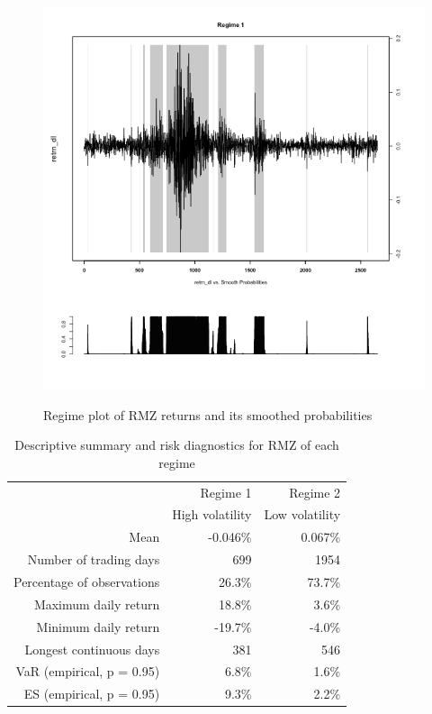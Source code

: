 \documentclass[12pt]{article}
\begin{document}
\begin{figure}[h]
\caption{Regime plot of RMZ returns and its smoothed probabilities} 
\centering 
\includegraphics[width=1\textwidth]{../results/regime/RMZ}
\label{fig: RMZregime}
\end{figure}

\begin{table}[!h]
\caption{Descriptive summary and risk diagnostics for RMZ of each regime} 
\centering 
\begin{tabular}{| r | r | r |} 
 \hline
& Regime 1 & Regime 2 \\
& High volatility & Low volatility \\
 \hline 
Mean & -0.046\% & 0.067\% \\
Number of trading days & 699 & 1954\\ 
Percentage of observations & 26.3\% & 73.7\% \\ 
Maximum daily return &18.8\% & 3.6\% \\
Minimum daily return & -19.7\% & -4.0\% \\
Longest continuous days & 381 & 546\\ \hline
VaR (empirical, p = 0.95) & 6.8\% & 1.6\% \\
ES (empirical, p = 0.95) & 9.3\% & 2.2\% \\
 \hline
\end{tabular}
\label{table:statSumRegimeRMZ}
\end{table}
\end{document}
